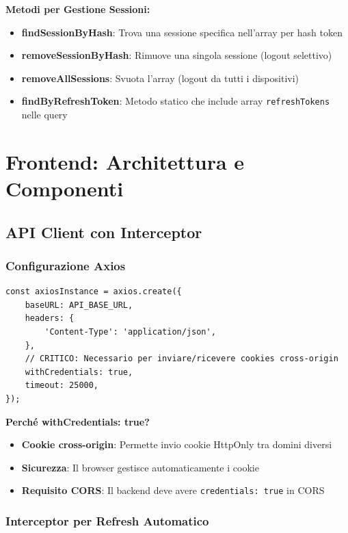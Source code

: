 \documentclass[11pt,a4paper]{article}
\newcommand{\code}[1]{\texttt{#1}}
\begin{document}
\textbf{Metodi per Gestione Sessioni:}
\begin{itemize}
    \item \textbf{findSessionByHash}: Trova una sessione specifica nell'array per hash token
    \item \textbf{removeSessionByHash}: Rimuove una singola sessione (logout selettivo)
    \item \textbf{removeAllSessions}: Svuota l'array (logout da tutti i dispositivi)
    \item \textbf{findByRefreshToken}: Metodo statico che include array \code{refreshTokens} nelle query
\end{itemize}

\section{Frontend: Architettura e Componenti}

\subsection{API Client con Interceptor}

\subsubsection{Configurazione Axios}

\begin{lstlisting}[caption=Configurazione Axios con Credentials]
const axiosInstance = axios.create({
    baseURL: API_BASE_URL,
    headers: {
        'Content-Type': 'application/json',
    },
    // CRITICO: Necessario per inviare/ricevere cookies cross-origin
    withCredentials: true,
    timeout: 25000,
});
\end{lstlisting}

\textbf{Perché withCredentials: true?}
\begin{itemize}
    \item \textbf{Cookie cross-origin}: Permette invio cookie HttpOnly tra domini diversi
    \item \textbf{Sicurezza}: Il browser gestisce automaticamente i cookie
    \item \textbf{Requisito CORS}: Il backend deve avere \code{credentials: true} in CORS
\end{itemize}

\subsubsection{Interceptor per Refresh Automatico}
\end{document}

